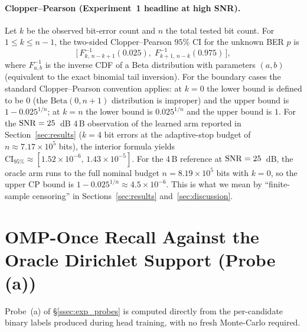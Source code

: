\paragraph{Clopper--Pearson (Experiment~1 headline at high SNR).}
Let $k$ be the observed bit-error count and $n$ the total tested bit count.
For $1 \leq k \leq n-1$, the two-sided Clopper--Pearson $95\%$ CI for the unknown BER $p$ is
\begin{equation*}
\bigl[\, F^{-1}_{k,\, n-k+1}(0.025),\; F^{-1}_{k+1,\, n-k}(0.975)\,\bigr],
\end{equation*}
where $F^{-1}_{a, b}$ is the inverse CDF of a Beta distribution with parameters $(a, b)$ (equivalent to the exact binomial tail inversion).
For the boundary cases the standard Clopper--Pearson convention applies: at $k = 0$ the lower bound is defined to be $0$ (the $\mathrm{Beta}(0, n+1)$ distribution is improper) and the upper bound is $1 - 0.025^{1/n}$; at $k = n$ the lower bound is $0.025^{1/n}$ and the upper bound is $1$.
For the $\mathrm{SNR} = 25$~dB 4\,B observation of the learned arm reported in
Section~\ref{sec:results} ($k = 4$ bit errors at the adaptive-stop budget
of $n \approx 7.17 \times 10^{5}$ bits), the interior formula yields
$\mathrm{CI}_{95\%} \approx [1.52 \times 10^{-6},\, 1.43 \times 10^{-5}]$.
For the 4\,B \Oracle{} reference at $\mathrm{SNR} = 25$~dB, the oracle arm runs
to the full nominal budget $n = 8.19 \times 10^{5}$ bits with $k=0$, so
the upper CP bound is $1 - 0.025^{1/n} \approx 4.5 \times 10^{-6}$.
This is what we mean by ``finite-sample censoring'' in
Sections~\ref{sec:results} and~\ref{sec:discussion}.

\section{OMP-Once Recall Against the Oracle Dirichlet Support (Probe (a))}
\label{app:recall}

Probe~(a) of \S\ref{ssec:exp_probes} is computed directly from the
per-candidate binary labels produced during head training, with no fresh
Monte-Carlo required.

